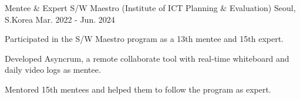 \begin{cventries}
  \cventry
    {Mentee \& Expert} %
    {S/W Maestro (Institute of ICT Planning \& Evaluation)} %
    {Seoul, S.Korea} %
    {Mar. 2022 - Jun. 2024} %
    {
      \begin{cvitems} %
        \item {Participated in the S/W Maestro program as a 13th mentee and 15th expert.}
        \item {Developed Asyncrum, a remote collaborate tool with real-time whiteboard and daily video logs as mentee.}
        \item {Mentored 15th mentees and helped them to follow the program as expert.}
      \end{cvitems}
    }

\end{cventries}
